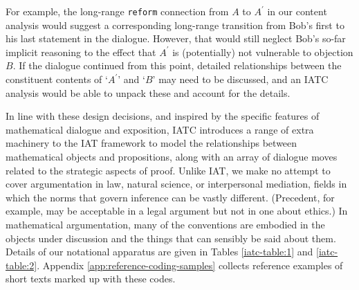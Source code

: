 \documentclass[smallextended,oneside]{svjour3}       %
\newcommand\nothing[1]{#1}
\let\paragraph\nothing
\begin{document}
For example, the long-range \texttt{reform} connection from $A$ to $A^\prime$ in
our content analysis would suggest a corresponding long-range transition from
Bob's first to his last statement in the dialogue.
However, that would still neglect Bob's so-far implicit reasoning
to the effect that $A^\prime$ is (potentially) not vulnerable to objection $B$.
If the dialogue continued from this point, detailed relationships between the constituent contents of `$A^\prime$' and `$B$' may need to be discussed, and an IATC analysis would be able to unpack these and account for the details.

\paragraph{In line with these design decisions, and inspired by the specific features of mathematical dialogue and exposition, IATC introduces a range of extra machinery to the IAT framework to model the relationships between mathematical objects and propositions, along with an array of dialogue moves related to the strategic aspects of proof.}
Unlike IAT, we make no attempt to cover argumentation in law, natural
science, or interpersonal mediation, fields in which the norms that
govern inference can be vastly different.  (Precedent, for example,
may be acceptable in a legal argument but not in one about ethics.)
In mathematical argumentation, many of the conventions are embodied in the objects under
discussion and the things that can sensibly be said about them.
Details of our notational apparatus are given in Tables
\ref{iatc-table:1} and \ref{iatc-table:2}.  
Appendix \ref{app:reference-coding-samples}
collects reference examples of short texts marked up with these codes.
\end{document}
